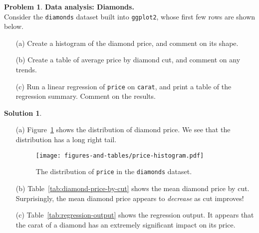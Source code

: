 \documentclass[11pt,letterpaper,english,oneside]{article} %
\theoremstyle{definition} %
\newtheorem{problem}{Problem}
\newtheorem{solution}{Solution}
\newenvironment{prob}{\clearpage \begin{problem}\hspace{0pt}}{\end{problem}}
\newenvironment{sol}{\begin{solution}\hspace{0pt}}{\end{solution}}
\begin{document}
\begin{prob} \textbf{Data analysis: Diamonds.} \\

\noindent Consider the \texttt{diamonds} dataset built into \texttt{ggplot2}, whose first few rows are shown below.



\begin{enumerate}
\item[(a)] Create a histogram of the diamond price, and comment on its shape.
\item[(b)] Create a table of average price by diamond cut, and comment on any trends.
\item[(c)] Run a linear regression of \texttt{price} on \texttt{carat}, and print a table of the regression summary. Comment on the results.
\end{enumerate}

\end{prob}

\begin{sol}

\begin{enumerate}
  \item[(a)] Figure~\ref{fig:price-hist} shows the distribution of diamond price. We see that the distribution has a long right tail.

  \begin{figure}[h!]
    \centering
    \texttt{[image: figures-and-tables/price-histogram.pdf]}
    \caption{The distribution of \texttt{price} in the \texttt{diamonds} dataset.}
    \label{fig:price-hist}
  \end{figure}

  \item[(b)] Table~\ref{tab:diamond-price-by-cut} shows the mean diamond price by cut. Surprisingly, the mean diamond price appears to \textit{decrease} as cut improves!
  

  \item[(c)] Table~\ref{tab:regression-output} shows the regression output. It appears that the carat of a diamond has an extremely significant impact on its price.

  
\end{enumerate}


\end{sol}
\end{document}
